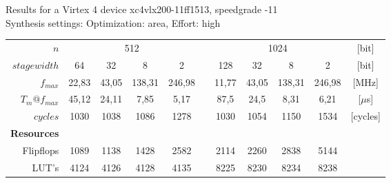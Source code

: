 \vspace{1cm}
\newline
Results for a Virtex 4 device xc4vlx200-11ff1513, speedgrade -11\\
Synthesis settings: Optimization: area, Effort: high\\
\begin{tabular}{rcccccccccc}
\hline
\hline
$n$     & \multicolumn{4}{c}{512}    &   & \multicolumn{4}{c}{1024}      & [bit] \bigstrut[t]\\
$stage width$ & 64    & 32    & 8     & 2    & & 128   & 32    & 8     & 2     & [bit] \bigstrut[b]\\
\hline
$f_{max}$  & 22,83 & 43,05 & 138,31 & 246,98 & & 11,77 & 43,05 & 138,31 & 246,98 & [MHz] \bigstrut[t]\\
$T_m@f_{max}$ & 45,12 & 24,11 & 7,85  & 5,17 & & 87,5  & 24,5  & 8,31  & 6,21  & [$\mu$s] \\
$cycles$ & 1030  & 1038  & 1086  & 1278 & & 1030  & 1054  & 1150  & 1534  & [cycles] \\
\textbf{Resources} &  &       &       &     &  &       &       &       &       &  \\
Flipflops & 1089  & 1138  & 1428  & 2582 & & 2114  & 2260  & 2838  & 5144  &  \\
LUT's & 4124  & 4126  & 4128  & 4135 & & 8225  & 8230  & 8234  & 8238  &  \bigstrut[b]\\
\hline
\hline
\end{tabular}%

